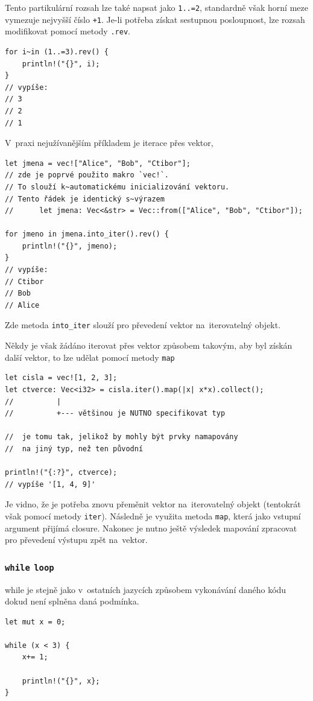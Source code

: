 \documentclass[a4paper, 12pt]{article} %
\newcommand{\rust}[1]{\texttt{#1}}
\begin{document}
            Tento partikulární rozsah lze také napsat jako \texttt{1..=2}, standardně však horní meze vymezuje nejvyšší číslo \texttt{+1}. Je-li potřeba získat sestupnou posloupnost, lze rozsah modifikovat pomocí metody \texttt{.rev}.
            \begin{verbatim}
for i~in (1..=3).rev() {
    println!("{}", i);
}
// vypíše:
// 3
// 2
// 1
            \end{verbatim}
            
            V~praxi nejužívanějším příkladem je iterace přes vektor,
            \begin{verbatim}
let jmena = vec!["Alice", "Bob", "Ctibor"];
// zde je poprvé použito makro `vec!`.
// To slouží k~automatickému inicializování vektoru.
// Tento řádek je identický s~výrazem
//      let jmena: Vec<&str> = Vec::from(["Alice", "Bob", "Ctibor"]);

for jmeno in jmena.into_iter().rev() {
    println!("{}", jmeno);
}
// vypíše:
// Ctibor
// Bob
// Alice
            \end{verbatim}
            
            Zde metoda \rust{into_iter} slouží pro převedení vektor na~iterovatelný objekt.
    
            Někdy je však žádáno iterovat přes vektor způsobem takovým, aby byl získán další vektor, to lze udělat pomocí metody \rust{map}
            \begin{verbatim}
let cisla = vec![1, 2, 3];
let ctverce: Vec<i32> = cisla.iter().map(|x| x*x).collect();
//          |
//          +--- většinou je NUTNO specifikovat typ

//  je tomu tak, jelikož by mohly být prvky namapovány
//  na jiný typ, než ten původní

println!("{:?}", ctverce);
// vypíše '[1, 4, 9]'
            \end{verbatim}
    
            Je vidno, že je potřeba znovu přeměnit vektor na~iterovatelný objekt (tentokrát však pomocí metody \rust{iter}\cite{iter_into_iter}). Následně je využita metoda \rust{map}, která jako vstupní argument přijímá closure. Nakonec je nutno ještě výsledek mapování zpracovat pro převedení výstupu zpět na~vektor.


        \subsubsection*{\rust{while} \rust{loop}}
            while je stejně jako v~ostatních jazycích způsobem vykonávání daného kódu dokud není splněna daná podmínka.
            \begin{verbatim}
let mut x = 0;

while (x < 3) {
    x+= 1;
    
    println!("{}", x};
}
            \end{verbatim}
            
\end{document}
